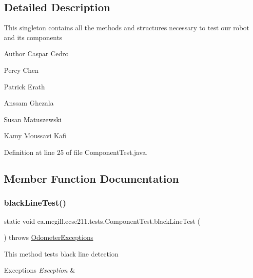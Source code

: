 \subsection{Detailed Description}
This singleton contains all the methods and structures necessary to test our robot and its components

\begin{DoxyAuthor}{Author}
Caspar Cedro 

Percy Chen 

Patrick Erath 

Anssam Ghezala 

Susan Matuszewski 

Kamy Moussavi Kafi 
\end{DoxyAuthor}


Definition at line 25 of file Component\+Test.\+java.



\subsection{Member Function Documentation}
\mbox{\label{enumca_1_1mcgill_1_1ecse211_1_1tests_1_1_component_test_a3f36cee9ca567c845377bec33554ba8b}} 
\subsubsection{\texorpdfstring{black\+Line\+Test()}{blackLineTest()}}
{\footnotesize\ttfamily static void ca.\+mcgill.\+ecse211.\+tests.\+Component\+Test.\+black\+Line\+Test (\begin{DoxyParamCaption}{ }\end{DoxyParamCaption}) throws \hyperlink{classca_1_1mcgill_1_1ecse211_1_1odometer_1_1_odometer_exceptions}{Odometer\+Exceptions}\hspace{0.3cm}{\ttfamily [static]}}

This method tests black line detection


\begin{DoxyExceptions}{Exceptions}
{\em Exception} & \\
\hline
\end{DoxyExceptions}


